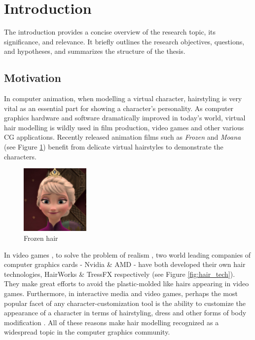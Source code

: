 \setcounter{page}{1}
\section{Introduction}
\label{chapter:introduction}
The introduction provides a concise overview of the research topic, its significance, and relevance. It briefly outlines the research objectives, questions, and hypotheses, and summarizes the structure of the thesis.
\subsection{Motivation}
In computer animation, when modelling a virtual character, hairstyling is very vital as an essential part for showing a character's personality. As computer graphics hardware and software dramatically improved in today's world, virtual hair modelling is wildly used in film production, video games and other various CG applications. Recently released animation films such as \emph{Frozen} and \emph{Moana} (see Figure \ref{fig:frozen}) benefit from delicate virtual hairstyles to demonstrate the characters. 
\begin{figure}[!htp]
\centering
\includegraphics[width=0.3\textwidth]{figs/Introduction/Frozen.png}
\caption{Frozen hair}
\label{fig:frozen}
\end{figure}

In video games \citep{dobrian2006nime}, to solve the problem of realism \citep{broad2021network}, two world leading companies of computer graphics cards - Nvidia \& AMD - have both developed their own hair technologies, HairWorks \& TressFX respectively (see Figure \ref{fig:hair_tech}). They make great efforts to avoid the plastic-molded like hairs appearing in video games. Furthermore, in interactive media and video games, perhaps the most popular facet of any character-customization tool is the ability to customize the appearance of a character in terms of hairstyling, dress and other forms of body modification \citep{Tokui2023surfing}. All of these reasons make hair modelling recognized as a widespread topic in the computer graphics community.

